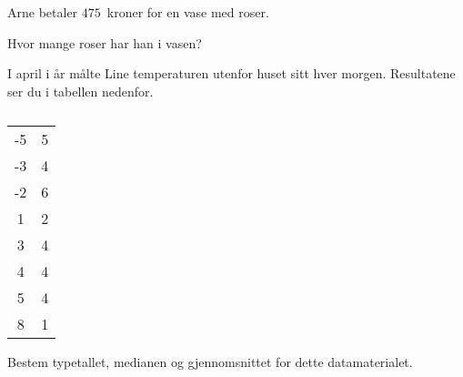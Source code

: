 Arne betaler $475$~kroner for en vase med roser.

\begin{oppgaver}
   Hvor mange roser har han i vasen?
\end{oppgaver}


\Oppgave[3] 

I april i år målte Line temperaturen utenfor huset sitt hver morgen. Resultatene
ser du i tabellen nedenfor.

\begin{table}[H]
    \centering
    \caption{}
    \label{tab:del-1-oppgave-8}
    \begin{tabular}{|S[table-format=2.0] |S[table-format=1.0]|}
         -5 & 5 \\
         -3 & 4 \\
         -2 & 6 \\
          1 & 2 \\
          3 & 4 \\
          4 & 4 \\
          5 & 4 \\
          8 & 1 \\ \hline
    \end{tabular}
\end{table}

Bestem typetallet, medianen og gjennomsnittet for dette datamaterialet.


\Oppgave[2]


